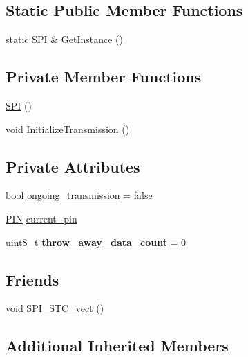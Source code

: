 \subsection*{Static Public Member Functions}
\begin{DoxyCompactItemize}
\item 
static \hyperlink{class_s_p_i___n_1_1_s_p_i}{S\+PI} \& \hyperlink{class_s_p_i___n_1_1_s_p_i_abc266ff9d817b8d4437d1da47fe8e7ae}{Get\+Instance} ()
\end{DoxyCompactItemize}
\subsection*{Private Member Functions}
\begin{DoxyCompactItemize}
\item 
\hyperlink{class_s_p_i___n_1_1_s_p_i_a8fec1a6e642a5758acf974b92e28a9e6}{S\+PI} ()
\item 
void \hyperlink{class_s_p_i___n_1_1_s_p_i_af973a5b4a970c3c01430037d578151ef}{Initialize\+Transmission} ()
\end{DoxyCompactItemize}
\subsection*{Private Attributes}
\begin{DoxyCompactItemize}
\item 
bool \hyperlink{class_s_p_i___n_1_1_s_p_i_aff61d4bfc6a6e0088c3653898b1e91b8}{ongoing\+\_\+transmission} = false
\item 
\hyperlink{struct_s_p_i___n_1_1_p_i_n}{P\+IN} \hyperlink{class_s_p_i___n_1_1_s_p_i_ac016c4eaed2db3f8b5523bf0d472ddd2}{current\+\_\+pin}
\item 
uint8\+\_\+t {\bfseries throw\+\_\+away\+\_\+data\+\_\+count} = 0\hypertarget{class_s_p_i___n_1_1_s_p_i_aaed8cc6f36275c3e33fcada1b9172742}{}\label{class_s_p_i___n_1_1_s_p_i_aaed8cc6f36275c3e33fcada1b9172742}

\end{DoxyCompactItemize}
\subsection*{Friends}
\begin{DoxyCompactItemize}
\item 
void \hyperlink{class_s_p_i___n_1_1_s_p_i_a96543550133e0b0c6ae83faad5c0d68d}{S\+P\+I\+\_\+\+S\+T\+C\+\_\+vect} ()
\end{DoxyCompactItemize}
\subsection*{Additional Inherited Members}


